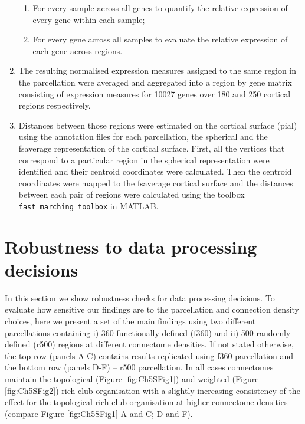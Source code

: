 \begin{enumerate}
      \begin{enumerate}
      \item For every sample across all genes to quantify the relative expression of every gene within each sample;
      \item For every gene across all samples to evaluate the relative expression of each gene across regions.
      \end{enumerate}
      \item The resulting normalised expression measures assigned to the same region in the parcellation were averaged and aggregated into a region by gene matrix consisting of expression measures for \num{10027} genes over 180 and 250 cortical regions respectively.
      \item Distances between those regions were estimated on the cortical surface (pial) using the annotation files for each parcellation, the spherical and the fsaverage representation of the cortical surface. First, all the vertices that correspond to a particular region in the spherical representation were identified and their centroid coordinates were calculated. Then the centroid coordinates were mapped to the fsaverage cortical surface and the distances between each pair of regions were calculated using the toolbox \texttt{fast\_marching\_toolbox} in MATLAB.
\end{enumerate}

\newpage
\section{Robustness to data processing decisions}
\label{app:AppendixCh5_2}

In this section we show robustness checks for data processing decisions. To evaluate how sensitive our findings are to the parcellation and connection density choices, here we present a set of the main findings using two different parcellations containing i) 360 functionally defined (f360) and ii) 500 randomly defined (r500) regions at different connectome densities. If not stated otherwise, the top row (panels A-C) contains results replicated using f360 parcellation and the bottom row (panels D-F) -- r500 parcellation. In all cases connectomes maintain the topological (Figure \ref{fig:Ch5SFig1}) and weighted (Figure \ref{fig:Ch5SFig2}) rich-club organisation with a slightly increasing consistency of the effect for the topological rich-club organisation at higher connectome densities (compare Figure \ref{fig:Ch5SFig1} A and C; D and F).

